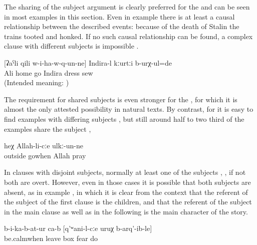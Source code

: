 The sharing of the subject argument is clearly preferred for the  and can be seen in most examples in this section. Even in example  there is at least a causal relationship between the described events: because of the death of Stalin the trains tooted and honked. If no such causal relationship can be found, a complex clause with different subjects is impossible .
%
\begin{exe}
	\ex	\label{ex:When Ali came home, Indira was sewing a dress}
		[ʡaˁli	qili	w-i-ha-w-q-un-ne]	Indira-l	kːurtːi	b-urχ-ul=de\\
		{}	Ali	home	go	Indira	dress	sew\\
	\glt	(Intended meaning: )
\end{exe}

The requirement for shared subjects is even stronger for the , for which it is almost the only attested possibility in natural texts. By contrast, for  it is easy to find examples with differing subjects , but still around half to two third of the examples share the subject , 
%
\begin{exe}
	\ex	\label{ex:‎When he left, he prayed to Allah}
	\gll	[tːura	sa-w-q-un=qːel]	heχ	Allah-li-cːe	ulkː-un-ne\\
		outside	gowhen		Allah	pray\\
	\glt	{}
\end{exe}

In clauses with disjoint subjects, normally at least one of the subjects , , if not both are overt. However, even in those cases it is possible that both subjects are absent, as in example , in which it is clear from the context that the referent of the subject of the first clause is the children, and that the referent of the subject in the main clause as well as in the following  is the main character of the story.
%
\begin{exe}
	\ex	\label{ex:‎When they did not calm down, (he) put them into the box, frightening them}
	\gll	[a-b-ug-an=qːel]	b-i-ka-b-at-ur	ca-b	[q'ʷani-l-cːe	uruχ	b-arq'-ib-le]\\
		be.calmwhen	leave		box	fear	do\\
	\glt	{}
\end{exe}

